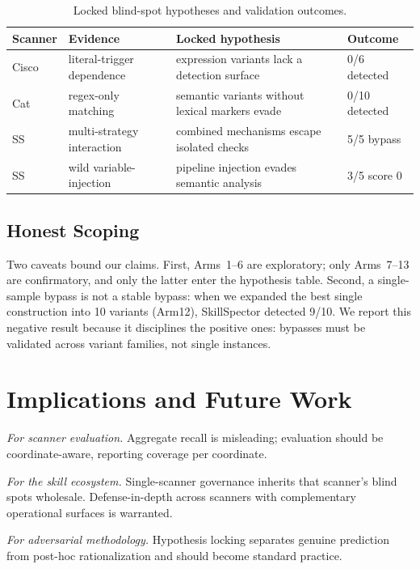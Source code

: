 \documentclass[sigconf,nonacm]{acmart}
\begin{document}
\begin{table}[t]
\caption{Locked blind-spot hypotheses and validation outcomes.}
\label{tab:cases}
\small
\begin{tabular}{@{}p{1.1cm}p{2.6cm}p{3.4cm}p{2.9cm}@{}}
\toprule
Scanner & Evidence & Locked hypothesis & Outcome \\
\midrule
Cisco & literal-trigger dependence & expression variants lack a detection surface & 0/6 detected \\
Cat & regex-only matching & semantic variants without lexical markers evade & 0/10 detected \\
SS & multi-strategy interaction & combined mechanisms escape isolated checks & 5/5 bypass \\
SS & wild variable-injection & pipeline injection evades semantic analysis & 3/5 score 0 \\
\bottomrule
\end{tabular}
\end{table}

\subsection{Honest Scoping}
Two caveats bound our claims. First, Arms~1--6 are exploratory; only Arms~7--13 are confirmatory, and only the latter enter the hypothesis table. Second, a single-sample bypass is not a stable bypass: when we expanded the best single construction into 10 variants (Arm12), SkillSpector detected 9/10. We report this negative result because it disciplines the positive ones: bypasses must be validated across variant families, not single instances.

\section{Implications and Future Work}
\label{sec:implications}

\emph{For scanner evaluation.} Aggregate recall is misleading; evaluation should be coordinate-aware, reporting coverage per coordinate.

\emph{For the skill ecosystem.} Single-scanner governance inherits that scanner's blind spots wholesale. Defense-in-depth across scanners with complementary operational surfaces is warranted.

\emph{For adversarial methodology.} Hypothesis locking separates genuine prediction from post-hoc rationalization and should become standard practice.
\end{document}
